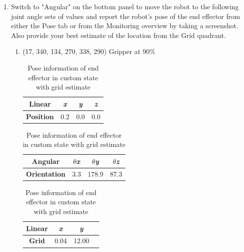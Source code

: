 \documentclass[12pt]{article}
\begin{document}
\begin{enumerate}
    \item Switch to "Angular" on the bottom panel to move the robot to the following joint angle sets of values and report the robot’s pose of the end effector from either the Pose tab or from the Monitoring overview by taking a screenshot. Also provide your best estimate of the location from the Grid quadrant.
    
    \begin{enumerate}

    \item (17, 340, 134, 270, 338, 290) Gripper at 90\%
    
    \begin{table}[H]
        \caption{Pose information of end effector in custom state with grid estimate}
        \begin{subtable}{.3\linewidth}
            \centering
            \begin{tabular}{cccc}
                \toprule
                \textbf{Linear} & \textit{x} & \textit{y} & \textit{z} \\\midrule
                \textbf{Position} & 0.2 & 0.0 & 0.0 \\\bottomrule
            \end{tabular}
        \end{subtable}
        \hfill
        \begin{subtable}{.4\linewidth}
            \centering
            \begin{tabular}{cccc}
                \toprule
                \textbf{Angular} & \textit{$\theta$x} & \textit{$\theta$y} & \textit{$\theta$z} \\\midrule
                \textbf{Orientation} & 3.3 & 178.9 & 87.3 \\\bottomrule
            \end{tabular}
        \end{subtable}
        \hfill
        \begin{subtable}{.25\linewidth}
            \centering
            \begin{tabular}{cccc}
                \toprule
                \textbf{Linear} & \textit{x} & \textit{y} \\\midrule
                \textbf{Grid} & 0.04 & 12.00 \\\bottomrule
            \end{tabular}
        \end{subtable}
    \end{table}
    

\end{enumerate}
\end{enumerate}
\end{document}
